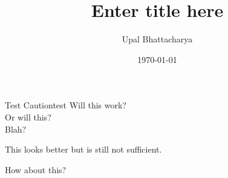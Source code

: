 \documentclass[a4paper]{article}
\author{Upal Bhattacharya}
\date{\today}
\title{Enter title here}
\begin{document}
\maketitle

\linenumbers

\begin{linenomath}
  \begin{caution}{Test Caution}{test}
    Will this work? \\
    Or will this? \\
    Blah?
  \end{caution}
\end{linenomath}

This looks better but is still not sufficient.

How about this?
\end{document}
